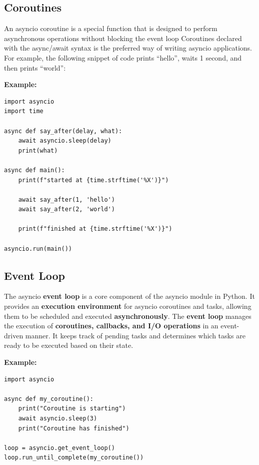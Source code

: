 \documentclass{report}
\begin{document}
    \subsection{Coroutines}
    \bigbreak \noindent 
    An asyncio coroutine is a special function that is designed to perform asynchronous operations without blocking the event loop
    \bigbreak \noindent 
    Coroutines declared with the async/await syntax is the preferred way of writing asyncio applications. For example, the following snippet of code prints “hello”, waits 1 second, and then prints “world”:
    \bigbreak \noindent 
    \begin{mdframed}
      \textbf{Example:}
      \begin{verbatim}
import asyncio
import time

async def say_after(delay, what):
    await asyncio.sleep(delay)
    print(what)

async def main():
    print(f"started at {time.strftime('%X')}")

    await say_after(1, 'hello')
    await say_after(2, 'world')

    print(f"finished at {time.strftime('%X')}")

asyncio.run(main())
      \end{verbatim}
      \bigbreak \noindent 
      \bigbreak \noindent 
    \end{mdframed}

    \pagebreak \bigbreak \noindent
    \subsection{Event Loop}
    The asyncio \textbf{event loop} is a core component of the asyncio module in Python. It provides an \textbf{execution environment} for asyncio coroutines and tasks, allowing them to be scheduled and executed \textbf{asynchronously}.
    \bigbreak \noindent 
    The \textbf{event loop} manages the execution of \textbf{coroutines, callbacks, and I/O operations} in an event-driven manner. It keeps track of pending tasks and determines which tasks are ready to be executed based on their state.
    \bigbreak \noindent 
    \begin{mdframed}
      \textbf{Example: }
      \begin{verbatim}
import asyncio

async def my_coroutine():
    print("Coroutine is starting")
    await asyncio.sleep(3)
    print("Coroutine has finished")

loop = asyncio.get_event_loop()
loop.run_until_complete(my_coroutine())
      \end{verbatim}
    \end{mdframed}
    \bigbreak \noindent 
\end{document}
